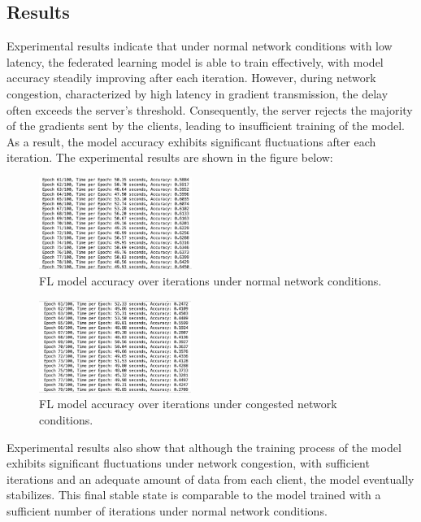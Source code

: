 \documentclass[conference]{IEEEtran}
\begin{document}
\subsection{Results}

Experimental results indicate that under normal network conditions with low latency, the federated learning model is able to train effectively, with model accuracy steadily improving after each iteration. However, during network congestion, characterized by high latency in gradient transmission, the delay often exceeds the server's threshold. Consequently, the server rejects the majority of the gradients sent by the clients, leading to insufficient training of the model. As a result, the model accuracy exhibits significant fluctuations after each iteration. The experimental results are shown in the figure below:

\begin{figure}[!ht]
    \centering
    \includegraphics[width=0.6\linewidth, height=3cm]{no_latency.png}
    \caption{FL model accuracy over iterations under normal network conditions.}
    \label{fig:no_latency} 
\end{figure}

\begin{figure}[!ht]
    \centering
    \includegraphics[width=0.6\linewidth, height=3cm]{latency.png}
    \caption{FL model accuracy over iterations under congested network conditions.}
    \label{fig:latency}
\end{figure}

\FloatBarrier

Experimental results also show that although the training process of the model exhibits significant fluctuations under network congestion, with sufficient iterations and an adequate amount of data from each client, the model eventually stabilizes. This final stable state is comparable to the model trained with a sufficient number of iterations under normal network conditions.
\end{document}
